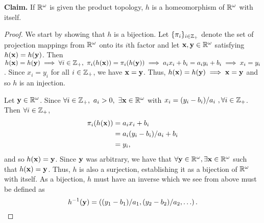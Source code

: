 \begin{solution}
    {\bf Claim.} If $\mathbb{R}^\omega$ is given the product topology, $h$ is a homeomorphism of $\mathbb{R}^\omega$ with itself.
    \begin{proof}
        We start by showing that $h$ is a bijection.
        Let $\{\pi_i\}_{i\in\mathbb{Z}_+}$ denote the set of projection mappings from $\mathbb{R}^\omega$ onto its $i$th factor and let $\mathbf{x}, \mathbf{y} \in \mathbb{R}^\omega$ satisfying $h(\mathbf{x}) = h(\mathbf{y})$.
        Then $h(\mathbf{x}) = h(\mathbf{y}) \implies \forall i \in \mathbb{Z}_+,~ \pi_i(h(\mathbf{x})) = \pi_i(h(\mathbf{y})) \implies a_i x_i + b_i = a_i y_i + b_i \implies x_i = y_i$.
        Since $x_i = y_i$ for all $i \in \mathbb{Z}_+$, we have $\mathbf{x} = \mathbf{y}$.
        Thus, $h(\mathbf{x}) = h(\mathbf{y}) \implies  \mathbf{x} = \mathbf{y}$ and so $h$ is an injection.

        Let $\mathbf{y} \in \mathbb{R}^\omega$.
        Since $\forall i \in \mathbb{Z}_+,~ a_i > 0,~ \exists \mathbf{x} \in \mathbb{R}^\omega$ with $x_i = (y_i - b_i) / a_i~, \forall i \in \mathbb{Z}_+$.
        Then $\forall i \in \mathbb{Z}_+$,
        \begin{align*}
            \pi_i(h(\mathbf{x}))   &= a_i x_i + b_i \\
                            &= a_i (y_i - b_i) / a_i + b_i \\
                            &= y_i,
        \end{align*}
        and so $h(\mathbf{x}) = \mathbf{y}$.
        Since $\mathbf{y}$ was arbitrary, we have that $\forall \mathbf{y} \in \mathbb{R}^\omega, \exists \mathbf{x} \in \mathbb{R}^\omega$ such that $h(\mathbf{x}) = \mathbf{y}$.
        Thus, $h$ is also a surjection, establishing it as a bijection of $\mathbb{R}^\omega$ with itself.
        As a bijection, $h$ must have an inverse which we see from above must be defined as
        \begin{equation*}
            h^{-1}(\mathbf{y}) = \left((y_1 - b_1) / a_1, (y_2 - b_2) / a_2, \ldots\right).
        \end{equation*}


\end{proof}
\end{solution}
